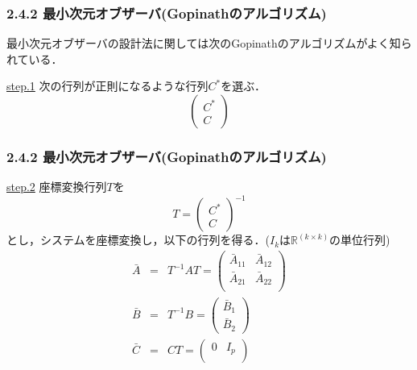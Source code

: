 \begin{frame}[t]
\frametitle{2.4.2 最小次元オブザーバ(Gopinathのアルゴリズム)}
最小次元オブザーバの設計法に関しては次のGopinathのアルゴリズムがよく知られている．

\noindent \underline{step.1}
次の行列が正則になるような行列$C^*$を選ぶ．
\begin{equation}
	\left(\begin{array}{c}
		C^* \\ 
		C 
	\end{array}\right)
\end{equation}

\end{frame}

\begin{frame}[t]
\frametitle{2.4.2 最小次元オブザーバ(Gopinathのアルゴリズム)}
\noindent \underline{step.2}
座標変換行列$T$を
\begin{equation}
        T =
	\left(\begin{array}{c}
		C^* \\ 
		C 
	\end{array}\right) ^{-1}
\end{equation}
とし，システムを座標変換し，以下の行列を得る．($I_k$は${\mathbb R}^{(k \times k)}$の単位行列)
\begin{eqnarray}
   \bar{A} & = & T^{-1} A T = \left(\begin{array}{cc}
				\bar{A}_{11} & \bar{A}_{12} \\
				\bar{A}_{21} & \bar{A}_{22} \\
			      \end{array}\right)
\\
   \bar{B} & = & T^{-1} B = \left(\begin{array} {c}
				\bar{B}_1 \\
				\bar{B}_2 
			    \end{array}\right)
\\
   \bar{C} & = & C T = \left(\begin{array}{cc}
				0 & I_{p} \\
			\end{array}\right)
\end{eqnarray}

\end{frame}

